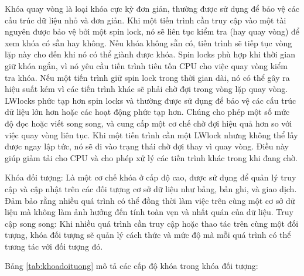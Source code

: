 \documentclass[14pt]{article}
\begin{document}
Khóa quay vòng là loại khóa cực kỳ đơn giản, thường được sử dụng để bảo
vệ các cấu trúc dữ liệu nhỏ và đơn giản. Khi một tiến trình cần truy cập vào một tài nguyên được bảo vệ bởi một spin lock, nó sẽ liên tục kiểm tra (hay quay vòng) để xem khóa có sẵn hay không. Nếu khóa không sẵn có, tiến trình sẽ tiếp tục vòng lặp này cho đến khi nó có thể giành được khóa. Spin locks phù hợp khi thời gian giữ khóa ngắn, vì nó yêu cầu tiến trình tiêu tốn CPU cho việc quay vòng kiểm tra khóa. Nếu một tiến trình giữ spin lock trong thời gian dài, nó có thể gây ra hiệu suất kém vì các tiến trình khác sẽ phải chờ đợi trong vòng lặp quay vòng.
LWlocks phức tạp hơn spin locks và thường được sử dụng để bảo vệ các cấu
trúc dữ liệu lớn hơn hoặc các hoạt động phức tạp hơn. Chúng cho phép một
số mức độ đọc hoặc viết song song, và cung cấp một cơ chế chờ đợi hiệu quả
hơn so với việc quay vòng liên tục. Khi một tiến trình cần một LWlock nhưng không thể lấy được ngay lập tức, nó sẽ đi vào trạng thái chờ đợi thay vì quay vòng. Điều này giúp giảm tải cho CPU và cho phép xử lý các tiến trình khác trong khi đang chờ.

Khóa đối tượng: Là một cơ chế khóa ở cấp độ cao, được sử dụng để quản lý
truy cập và cập nhật trên các đối tượng cơ sở dữ liệu như bảng, bản ghi, và giao dịch. Đảm bảo rằng nhiều quá trình có thể đồng thời làm việc trên cùng một cơ sở dữ liệu mà không làm ảnh hưởng đến tính toàn vẹn và nhất quán của dữ liệu. Truy cập song song: Khi nhiều quá trình cần truy cập hoặc thao tác trên cùng một đối tượng, khóa đối tượng sẽ quản lý cách thức và mức độ mà mỗi quá trình có thể tương tác với đối tượng đó.

Bảng \ref{tab:khoadoituong} mô tả các cấp độ khóa trong khóa đối tượng: 
\end{document}
